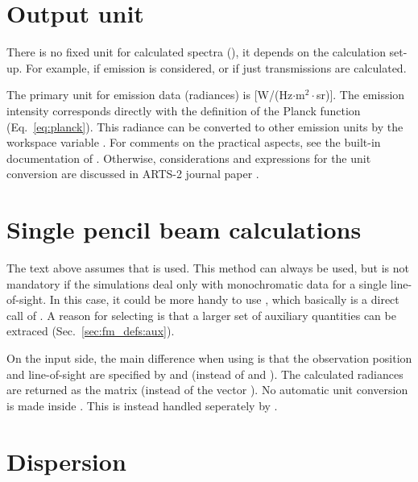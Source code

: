 \section{Output unit}
\label{sec:fm_defs:unit}

There is no fixed unit for calculated spectra (), it depends on the
calculation set-up. For example, if emission is considered, or if just
transmissions are calculated. 

The primary unit for emission data (radiances) is [W/(Hz$\cdot$m$^2\cdot$sr)].
The emission intensity corresponds directly with the definition of the Planck
function (Eq.~\ref{eq:planck}). This radiance can be converted to other
emission units by the workspace variable . For comments on
the practical aspects, see the built-in documentation of .
Otherwise, considerations and expressions for the unit conversion are
discussed in ARTS-2 journal paper \citep[][Sec.~5.7]{eriksson:arts2:11}.



\section{Single pencil beam calculations}
\label{sec:fm_defs:single_beams}

The text above assumes that  is used. This method can always be
used, but  is not mandatory if the simulations deal only with
monochromatic data for a single line-of-sight. In this case, it could be more
handy to use , which basically is a direct call of
. A reason for selecting  is that
a larger set of auxiliary quantities can be extraced
(Sec.~\ref{sec:fm_defs:aux}). 

On the input side, the main difference when using  is that
the observation position and line-of-sight are specified by 
and  (instead of  and
). The calculated radiances are returned as the matrix
 (instead of the vector ). 
No automatic unit conversion is made inside . This is
instead handled seperately by .




\section{Dispersion}
\label{sec:fm_defs:dispersion}

